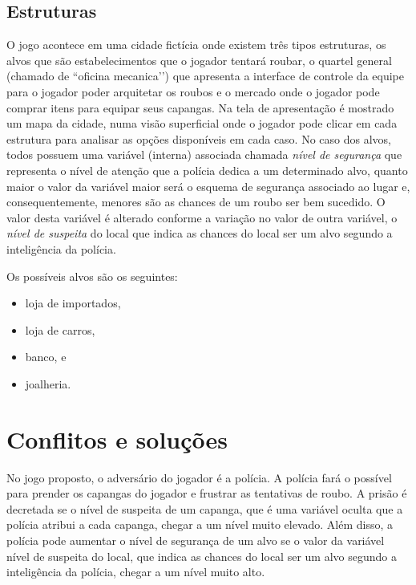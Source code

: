 \subsection{Estruturas}
O jogo acontece em uma cidade fictícia onde existem três tipos estruturas, os alvos que são estabelecimentos que o jogador tentará roubar, o quartel general (chamado de ``oficina mecanica’’) que apresenta a interface de controle da equipe para o jogador poder arquitetar os roubos e o mercado onde o jogador pode comprar itens para equipar seus capangas.
Na tela de apresentação é mostrado um mapa da cidade, numa visão superficial onde o jogador pode clicar em cada estrutura para analisar as opções disponíveis em cada caso.
No caso dos alvos, todos possuem uma variável (interna) associada chamada \emph{nível de segurança} que representa o nível de atenção que a polícia dedica a um determinado alvo, quanto maior o valor da variável maior será o esquema de segurança associado ao lugar e, consequentemente, menores são as chances de um roubo ser bem sucedido.
O valor desta variável é alterado conforme a variação no valor de outra variável, o \emph{nível de suspeita} do local que indica as chances do local ser um alvo segundo a inteligência da polícia.

Os possíveis alvos são os seguintes:
\begin{itemize}
\item loja de importados,
\item loja de carros,
\item banco, e
\item joalheria.
\end{itemize}


\section{Conflitos e soluções}
No jogo proposto, o adversário do jogador é a polícia. A polícia fará o possível para prender os capangas do jogador e frustrar as tentativas de roubo. A prisão é decretada se o nível de suspeita de um capanga, que é uma variável oculta que a polícia atribui a cada capanga, chegar a um nível muito elevado. Além disso, a polícia pode aumentar o nível de segurança de um alvo se  o valor da variável nível de suspeita do local, que indica as chances do local ser um alvo segundo a inteligência da polícia, chegar a um nível muito alto.

